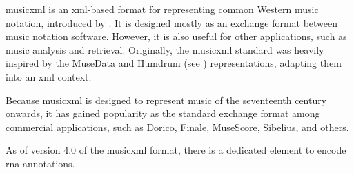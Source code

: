 


\gls{musicxml} is an \gls{xml}-based format for representing
common Western music notation, introduced by
\textcite{good2001musicxml}. It is designed mostly as an
exchange format between music notation software. However, it
is also useful for other applications, such as music
analysis and retrieval. Originally, the \gls{musicxml} standard
was heavily inspired by the MuseData and Humdrum (see
) representations, adapting
them into an \gls{xml} context.



Because \gls{musicxml} is designed to represent music of the
seventeenth century onwards, it has gained popularity as the
standard exchange format among commercial applications, such
as Dorico,
Finale,
MuseScore,
Sibelius, and
others.



As of version 4.0 of the \gls{musicxml} format, there is a dedicated  element to encode \gls{rna} annotations.
